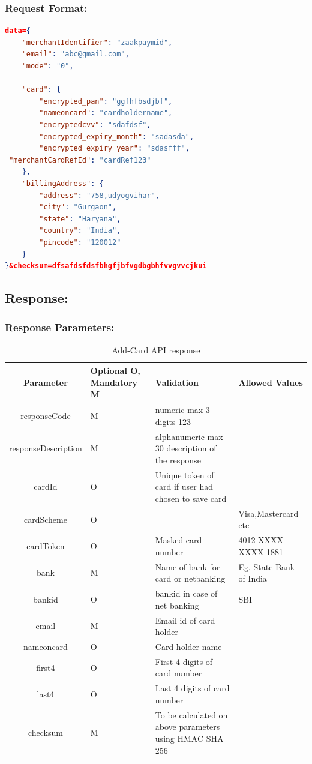 \documentclass{article}
\begin{document}
\subsubsection{Request Format:}
 \begin{lstlisting}[language=json,breaklines=true]
data={ 
    "merchantIdentifier": "zaakpaymid", 
    "email": "abc@gmail.com", 
    "mode": "0", 
   
    "card": { 
        "encrypted_pan": "ggfhfbsdjbf", 
        "nameoncard": "cardholdername", 
        "encryptedcvv": "sdafdsf", 
        "encrypted_expiry_month": "sadasda", 
        "encrypted_expiry_year": "sdasfff", 
 "merchantCardRefId": "cardRef123" 
    }, 
    "billingAddress": { 
        "address": "758,udyogvihar", 
        "city": "Gurgaon", 
        "state": "Haryana", 
        "country": "India", 
        "pincode": "120012" 
    } 
}&checksum=dfsafdsfdsfbhgfjbfvgdbgbhfvvgvvcjkui
\end{lstlisting}
\newpage
\subsection{Response:}
\subsubsection{Response Parameters:}
 \begin{longtable}{||c|| p{2.09cm}|| p{5.5cm}| p{4.7cm}||}
 \caption{Add-Card API response}\\
    \rowcolor{green!50}
\bfseries{Parameter} & \bfseries{Optional O, Mandatory M} & \bfseries{Validation} & \bfseries{Allowed Values} \\ \hline
responseCode  & M & numeric max 3 digits 123 &  \\
responseDescription  & M & alphanumeric max 30 description of the response & \\
cardId  & O & Unique token of card if user had chosen to save card  & \\
cardScheme  & O  &  & Visa,Mastercard etc \\
cardToken  & O & Masked card number & 4012 XXXX XXXX 1881\\
bank  & M  & Name of bank for card or netbanking & Eg. State Bank of India\\
bankid  & O  & bankid in case of net banking & SBI\\
email  & M  & Email id of card holder  & \\
nameoncard & O& Card holder name& \\
first4 & O & First 4 digits of card number &\\
last4 & O & Last 4 digits of card number & \\
checksum & M & To be calculated on above parameters using HMAC SHA 256 & \\
\end{longtable}
\end{document}
